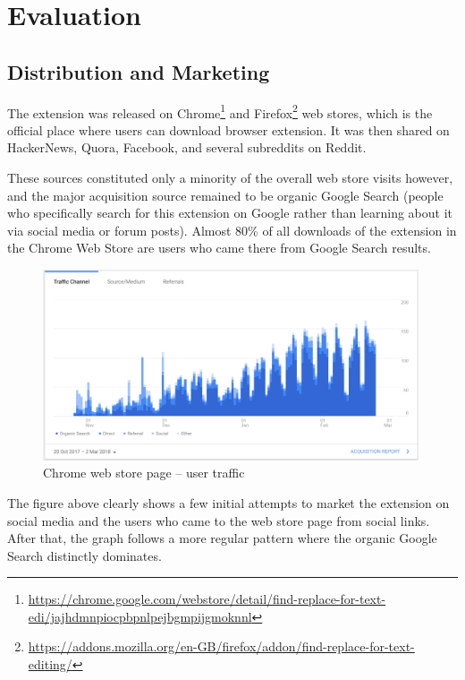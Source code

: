 \documentclass[bsc,frontabs,twoside,singlespacing,parskip,deptreport]{infthesis}
\begin{document}
\chapter{Evaluation}
\label{chapter:evaluation}

\section{Distribution and Marketing}
The extension was released on Chrome\footnote{\url{https://chrome.google.com/webstore/detail/find-replace-for-text-edi/jajhdmnpiocpbpnlpejbgmpijgmoknnl}} and Firefox\footnote{\url{https://addons.mozilla.org/en-GB/firefox/addon/find-replace-for-text-editing/}} web stores, which is the official place where users can download browser extension. It was then shared on HackerNews, Quora, Facebook, and several subreddits on Reddit.

These sources constituted only a minority of the overall web store visits however, and the major acquisition source remained to be organic Google Search (people who specifically search for this extension on Google rather than learning about it via social media or forum posts). Almost 80\% of all downloads of the extension in the Chrome Web Store are users who came there from Google Search results.

\begin{figure}[h]
\centering
\includegraphics[width=0.99\textwidth]{../docs/user-acquisition.png}
\caption{Chrome web store page -- user traffic}
\end{figure}

The figure above clearly shows a few initial attempts to market the extension on social media and the users who came to the web store page from social links. After that, the graph follows a more regular pattern where the organic Google Search distinctly dominates.
\end{document}
